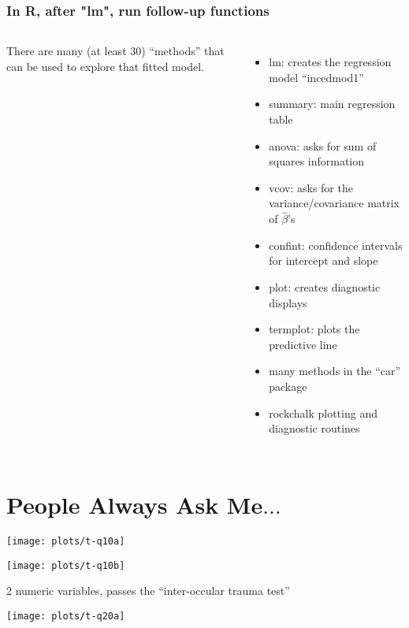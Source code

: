 \documentclass[10pt,english]{beamer}
\def\lyxframeend{} %
\newenvironment{topcolumns}{\begin{columns}[t]}{\end{columns}}
\def\Sweavesize{\normalsize}
\begin{document}
\begin{frame}[containsverbatim]
\frametitle{In R, after "lm", run follow-up functions}
\begin{topcolumns}%




\column{6cm}


There are many (at least 30) ``methods'' that can be used to explore
that fitted model.




\def\Sweavesize{\scriptsize}



\column{6cm}
\begin{itemize}
\item lm: creates the regression model ``incedmod1''
\item summary: main regression table
\item anova: asks for sum of squares information
\item vcov: asks for the variance/covariance matrix of $\hat{\beta}$'s
\item confint: confidence intervals for intercept and slope
\item plot: creates diagnostic displays
\item termplot: plots the predictive line
\item many methods in the ``car'' package
\item rockchalk plotting and diagnostic routines
\end{itemize}
\end{topcolumns}%
\end{frame}


\lyxframeend{}\section{People Always Ask Me$\ldots$}


\lyxframeend{}


\texttt{[image: plots/t-q10a]}


\lyxframeend{}


\texttt{[image: plots/t-q10b]}

2 numeric variables, passes the ``inter-occular trauma test''


\lyxframeend{}


\texttt{[image: plots/t-q20a]}


\lyxframeend{}
\end{document}
